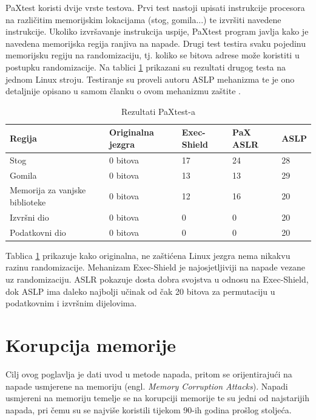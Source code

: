 \documentclass[times, utf8, diplomski, numeric]{fer}
\begin{document}
PaXtest koristi dvije vrste testova. Prvi test nastoji upisati
instrukcije procesora na različitim memorijskim lokacijama (stog,
gomila...) te izvršiti navedene instrukcije. Ukoliko izvršavanje
instrukcija uspije, PaXtest program javlja kako je navedena
memorijska regija ranjiva na napade. Drugi test testira svaku
pojedinu memorijsku regiju na randomizaciju, tj. koliko se bitova
adrese može koristiti u postupku randomizacije. Na tablici 
\ref{tbl:paxtest_results} prikazani su rezultati drugog testa na
jednom Linux stroju. Testiranje su proveli autoru ASLP mehanizma te
je ono detaljnije opisano u samom članku o ovom mehanizmu zaštite \citep{aslp}.

\begin{table}[htb]
\small
\caption{Rezultati PaXtest-a}
\label{tbl:paxtest_results}
\centering
\begin{tabular}{|l|l|l|l|l|}
\hline
Regija & Originalna jezgra & Exec-Shield & PaX ASLR & ASLP \\ \hline
Stog & 0 bitova & 17 & 24 & 28 \\ \hline
Gomila & 0 bitova & 13 & 13 & 29 \\ \hline
Memorija za vanjske biblioteke & 0 bitova & 12 & 16 & 20 \\ \hline
Izvršni dio & 0 bitova & 0 & 0 & 20 \\ \hline
Podatkovni dio & 0 bitova & 0 & 0 & 20 \\ \hline
\end{tabular}
\end{table}

Tablica \ref{tbl:paxtest_results} prikazuje kako originalna, ne
zaštićena Linux jezgra nema nikakvu razinu randomizacije.
Mehanizam Exec-Shield je najosjetljiviji na napade vezane uz
randomizaciju. ASLR pokazuje dosta dobra svojstva u odnosu na
Exec-Shield, dok ASLP ima daleko najbolji učinak od čak 20 bitova
za permutaciju u podatkovnim i izvršnim dijelovima.

\chapter{Korupcija memorije}

Cilj ovog poglavlja je dati uvod u metode napada, pritom se
orijentirajući na napade usmjerene na memoriju (engl. \emph{Memory
Corruption Attacks}).  Napadi usmjereni na memoriju temelje se na
korupciji memorije te su jedni od najstarijih napada, pri čemu su se
najviše koristili tijekom 90-ih godina prošlog stoljeća.
\end{document}
